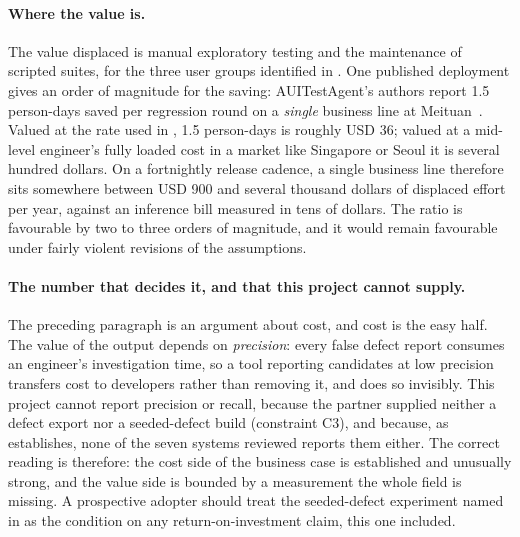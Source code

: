 \paragraph{Where the value is.} The value displaced is manual exploratory
testing and the maintenance of scripted suites, for the three user groups
identified in . One published deployment gives an order of
magnitude for the saving: AUITestAgent's authors report 1.5 person-days saved
per regression round on a \emph{single} business line at
Meituan~\cite{auitestagent}. Valued at the rate used in ,
1.5 person-days is roughly USD 36; valued at a mid-level engineer's fully
loaded cost in a market like Singapore or Seoul it is several hundred dollars.
On a fortnightly release cadence, a single business line therefore sits
somewhere between USD 900 and several thousand dollars of displaced effort per
year, against an inference bill measured in tens of dollars. The ratio is
favourable by two to three orders of magnitude, and it would remain favourable
under fairly violent revisions of the assumptions.

\paragraph{The number that decides it, and that this project cannot supply.}
The preceding paragraph is an argument about cost, and cost is the easy half.
The value of the output depends on \emph{precision}: every false defect report
consumes an engineer's investigation time, so a tool reporting candidates at
low precision transfers cost to developers rather than removing it, and does so
invisibly. This project cannot report precision or recall, because the partner
supplied neither a defect export nor a seeded-defect build (constraint C3), and
because, as  establishes, none of the seven systems
reviewed reports them either. The correct reading is therefore: the cost side
of the business case is established and unusually strong, and the value side is
bounded by a measurement the whole field is missing. A prospective adopter
should treat the seeded-defect experiment named in  as the
condition on any return-on-investment claim, this one included.

